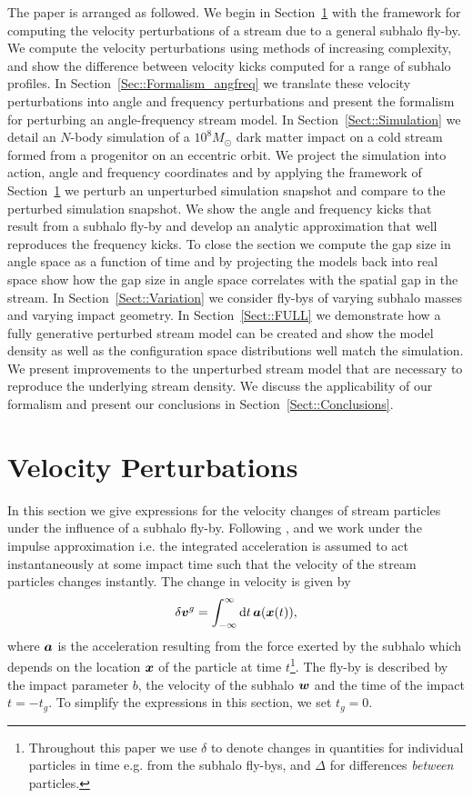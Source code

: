 \documentclass[useAMS,usenatbib,fleqn,a4paper]{mn2e}
\newcommand{\bs}[1]{\bmath{#1}}
\providecommand{\DIFaddbegin}{} %
\begin{document}
The paper is arranged as followed. We begin in Section~\ref{Sect::Formalism} with the framework for computing the velocity perturbations of a stream due to a general subhalo fly-by. We compute the velocity perturbations using methods of increasing complexity, and show the difference between velocity kicks computed for a range of subhalo profiles. In Section~\ref{Sec::Formalism_angfreq} we translate these velocity perturbations into angle and frequency perturbations and present the formalism for perturbing an angle-frequency stream model. In Section~\ref{Sect::Simulation} we detail an $N$-body simulation of a $10^8M_\odot$ dark matter impact on a cold stream formed from a progenitor on an eccentric orbit. We project the simulation into action, angle and frequency coordinates and by applying the framework of Section~\ref{Sect::Formalism} we perturb an unperturbed simulation snapshot and compare to the perturbed simulation snapshot. We show the angle and frequency kicks that result from a subhalo fly-by and develop an analytic approximation that well reproduces the frequency kicks. To close the section we compute the gap size in angle space as a function of time and by projecting the models back into real space show how the gap size in angle space correlates with the spatial gap in the stream.  In Section~\ref{Sect::Variation} we consider fly-bys of varying subhalo masses and varying impact geometry. In Section~\ref{Sect::FULL} we demonstrate how a fully generative perturbed stream model can be created and show the model density as well as the configuration space distributions well match the simulation. We present improvements to the unperturbed stream model that are necessary to reproduce the underlying stream density. We discuss the applicability of our formalism and present our conclusions in Section~\ref{Sect::Conclusions}.

\section{Velocity Perturbations}\label{Sect::Formalism}
In this section we give expressions for the velocity changes of stream particles under the influence of a subhalo fly-by. Following \cite{YoonJohnstonHogg}, \cite{Carlberg2013} and \cite{ErkalBelokurov2015} we work under the impulse approximation i.e. the integrated acceleration is assumed to act instantaneously at some impact time such that the velocity of the stream particles changes instantly. The change in velocity is given by
\begin{equation}
\delta\bs{v}^g = \int_{-\infty}^{\infty} \mathrm{d} t\,\bs{a}(\bs{x}(t)),
\end{equation}
where $\bs{a}$ is the acceleration resulting from the force exerted by the subhalo which depends on the location $\bs{x}$ of the particle at time $t$\footnote{Throughout this paper we use $\delta$ to denote changes in quantities for individual particles in time e.g. from the subhalo fly-bys, and $\Delta$ for differences \emph{between} particles.}. The fly-by is described by the impact parameter $b$, the velocity of the subhalo $\bs{w}$ and the time of the impact $t=-t_g$. To simplify the expressions in this section, we set $t_g=0$.
\DIFaddbegin 
\end{document}

